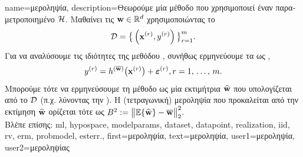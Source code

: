 {name={\foreignlanguage{greek}{μεροληψία}},
	description={\foreignlanguage{greek}{Θεωρούμε μία μέθοδο} 
		 \foreignlanguage{greek}{που χρησιμοποιεί έναν παραμετροποιημένο}  $\mathcal{H}$. 
		\foreignlanguage{greek}{Μαθαίνει τις}  ${\bf w} \in \mathbb{R}^{d}$ 
		\foreignlanguage{greek}{χρησιμοποιώντας το}  
		$$\mathcal{D}=\big\{ \left( {\bf x}^{(r)},y^{(r)} \right) \big\}_{r=1}^{m}.$$ 
		\foreignlanguage{greek}{Για να αναλύσουμε τις ιδιότητες της μεθόδου} , \foreignlanguage{greek}{συνήθως 
		ερμηνεύουμε τα}  \foreignlanguage{greek}{ως}   , 
		$$y^{(r)} = h^{(\overline{{\bf w}})}\big( {\bf x}^{(r)} \big) + \bm{\varepsilon}^{(r)}, r=1, \,\ldots, \,m.$$ 
		\foreignlanguage{greek}{Μπορούμε τότε να ερμηνεύσουμε τη μέθοδο}  \foreignlanguage{greek}{ως μία 
		εκτιμήτρια $\widehat{{\bf w}}$ που υπολογίζεται από το $\mathcal{D}$ (π.χ. λύνοντας την} ). 
		\foreignlanguage{greek}{Η (τετραγωνική) μεροληψία που προκαλείται από την εκτίμηση $\widehat{{\bf w}}$ ορίζεται τότε ως} 
		$B^{2} := \big\| \mathbb{E} \{ \widehat{{\bf w}}  \}- \overline{{\bf w}}\big\|_{2}^{2}$.\\
		\foreignlanguage{greek}{Βλέπε επίσης:} \gls{ml}, \gls{hypospace}, \gls{modelparams}, \gls{dataset}, \gls{datapoint}, \gls{realization}, \gls{iid}, 
		\gls{rv}, \gls{erm}, \gls{probmodel}, \gls{esterr}.},
	first={\foreignlanguage{greek}{μεροληψία}},
	text={\foreignlanguage{greek}{μεροληψία}},
	user1={\foreignlanguage{greek}{μεροληψία}}, %
	user2={\foreignlanguage{greek}{μεροληψίας}} %
}

